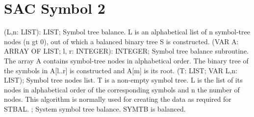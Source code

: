 \section{ SAC Symbol 2  } 
 (L,n: LIST): LIST; \eproc
\bcom Symbol tree balance. L is an alphabetical list of n symbol-tree
nodes (n gt 0), out of which a balanced binary tree S is constructed.  \ecom 
{} (VAR A: ARRAY OF LIST; l, r: INTEGER): INTEGER; \eproc
\bcom Symbol tree balance subroutine. The array A contains symbol-tree
nodes in alphabetical order. The binary tree of the symbols in
A[l..r] is constructed and A[m] is its root.  \ecom 
{} (T: LIST; VAR L,n: LIST); \eproc
\bcom Symbol tree nodes list. T is a non-empty symbol tree.
L is the list of its nodes in alphabetical order of the 
corresponding symbols and n the number of nodes. This algorithm
is normally used for creating the data as required for STBAL.  \ecom 
{} ; \eproc
\bcom System symbol tree balance. SYMTB is balanced.  \ecom 
